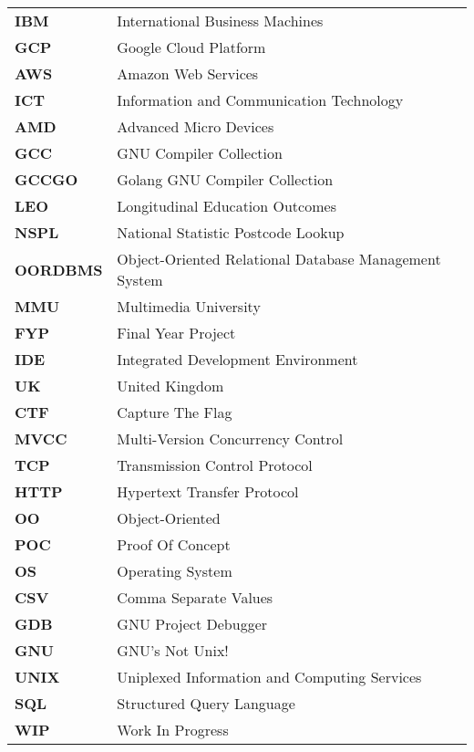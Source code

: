 \documentclass[12pt, oneside]{Thesis}
\begin{document}


\lstlistoflistings

\pagebreak
{} 
%
%
\begin{table}[ht]
\begin{tabular}{p{2.5cm}p{11.0cm}}

\textbf{IBM} & International Business Machines\\
\textbf{GCP} & Google Cloud Platform\\
\textbf{AWS} & Amazon Web Services\\
\textbf{ICT} & Information and Communication Technology\\
\textbf{AMD} & Advanced Micro Devices\\
\textbf{GCC} & GNU Compiler Collection\\
\textbf{GCCGO} & Golang GNU Compiler Collection\\
\textbf{LEO} & Longitudinal Education Outcomes \\
\textbf{NSPL} & National Statistic Postcode Lookup\\
\textbf{OORDBMS} & Object-Oriented Relational Database Management System\\
\textbf{MMU} & Multimedia University\\
\textbf{FYP} & Final Year Project\\
\textbf{IDE} & Integrated Development Environment\\
\textbf{UK} & United Kingdom\\
\textbf{CTF} & Capture The Flag\\ 
\textbf{MVCC} & Multi-Version Concurrency Control\\
\textbf{TCP} & Transmission Control Protocol\\
\textbf{HTTP} & Hypertext Transfer Protocol\\
\textbf{OO} & Object-Oriented\\
\textbf{POC} & Proof Of Concept\\
\textbf{OS} & Operating System\\
\textbf{CSV} & Comma Separate Values\\
\textbf{GDB} & GNU Project Debugger\\
\textbf{GNU} & GNU's Not Unix!\\
\textbf{UNIX} & Uniplexed Information and Computing Services\\
\textbf{SQL} & Structured Query Language\\
\textbf{WIP} & Work In Progress\\


\end{tabular}
\end{table}
\end{document}
